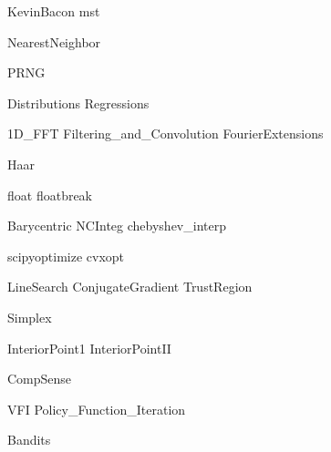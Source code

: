 \documentclass[nociteref]{SIAM-GH-book}
\begin{document}
{KevinBacon}
{mst}

{NearestNeighbor}

{PRNG}

{Distributions}
{Regressions}

{1D_FFT}
{Filtering_and_Convolution}
{FourierExtensions}

{Haar}

{float}
{floatbreak}

{Barycentric}
{NCInteg}
{chebyshev_interp}


{scipyoptimize}
{cvxopt}

{LineSearch}
{ConjugateGradient}
{TrustRegion}

{Simplex}

{InteriorPoint1}
{InteriorPointII}

{CompSense}

{VFI}
{Policy_Function_Iteration}

{Bandits}
\end{document}
